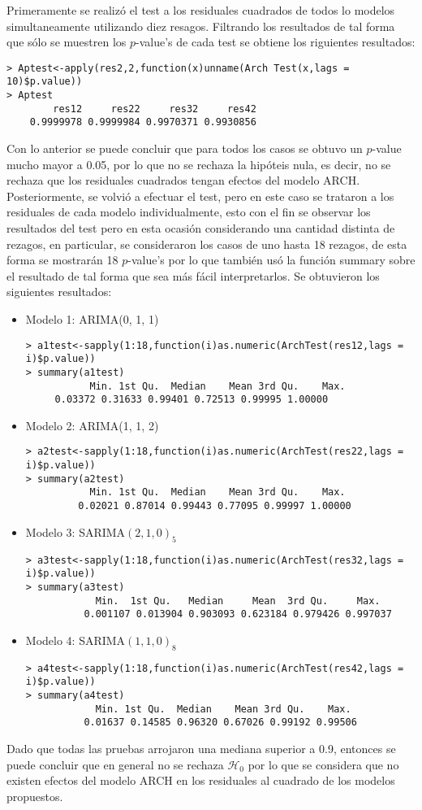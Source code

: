 \documentclass{article}
\theoremstyle{remark}
\begin{document}
Primeramente se realizó el test a los residuales cuadrados de todos lo modelos simultaneamente utilizando diez resagos. Filtrando los resultados de tal forma que sólo se muestren los $p$-value's de cada test se obtiene los riguientes resultados:
\begin{verbatim}
> Aptest<-apply(res2,2,function(x)unname(Arch Test(x,lags = 10)$p.value))
> Aptest
	    res12     res22     res32     res42 
	0.9999978 0.9999984 0.9970371 0.9930856
\end{verbatim}
Con lo anterior se puede concluir que para todos los casos se obtuvo un \(p\)-value mucho mayor a 0.05, por lo que no se rechaza la hipóteis nula, es decir, no se rechaza que los residuales cuadrados tengan efectos del modelo ARCH.\\

Posteriormente, se volvió a efectuar el test, pero en este caso se trataron a los residuales de cada modelo individualmente, esto con el fin se observar los resultados del test pero en esta ocasión considerando una cantidad distinta de rezagos, en particular, se consideraron los casos de uno hasta 18 rezagos, de esta forma se mostrarán 18 $p$-value's por lo que también usó la función summary sobre el resultado de tal forma que sea más fácil interpretarlos. Se obtuvieron los siguientes resultados:
\begin{itemize}
	\item Modelo 1: ARIMA(0, 1, 1)
	\begin{verbatim}
> a1test<-sapply(1:18,function(i)as.numeric(ArchTest(res12,lags = i)$p.value))
> summary(a1test)
		   Min. 1st Qu.  Median    Mean 3rd Qu.    Max. 
	 0.03372 0.31633 0.99401 0.72513 0.99995 1.00000 
	\end{verbatim}
	\item Modelo 2: ARIMA(1, 1, 2)
	\begin{verbatim}
> a2test<-sapply(1:18,function(i)as.numeric(ArchTest(res22,lags = i)$p.value))
> summary(a2test)
		   Min. 1st Qu.  Median    Mean 3rd Qu.    Max. 
		 0.02021 0.87014 0.99443 0.77095 0.99997 1.00000 
	\end{verbatim}
	\item Modelo 3: SARIMA$(2, 1, 0)_5$
	\begin{verbatim}
> a3test<-sapply(1:18,function(i)as.numeric(ArchTest(res32,lags = i)$p.value))
> summary(a3test)
		    Min.  1st Qu.   Median     Mean  3rd Qu.     Max. 
		  0.001107 0.013904 0.903093 0.623184 0.979426 0.997037 
	\end{verbatim}
	\item Modelo 4: SARIMA$(1, 1, 0)_8$
	\begin{verbatim}
> a4test<-sapply(1:18,function(i)as.numeric(ArchTest(res42,lags = i)$p.value))
> summary(a4test)
		    Min. 1st Qu.  Median    Mean 3rd Qu.    Max. 
		  0.01637 0.14585 0.96320 0.67026 0.99192 0.99506 
	\end{verbatim}
\end{itemize}
Dado que todas las pruebas arrojaron una mediana superior a 0.9, entonces se puede concluir que en general no se rechaza $\mathscr{H}_0$ por lo que se considera que no existen efectos del modelo ARCH en los residuales al cuadrado de los modelos propuestos.\\
\end{document}
